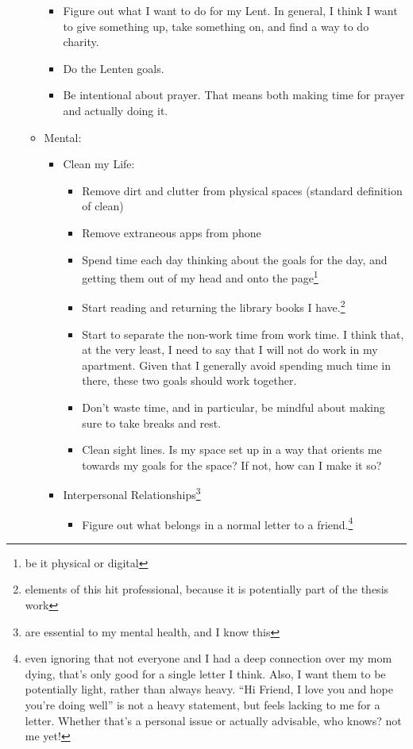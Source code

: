 \documentclass[12pt]{article}[titlepage]
\newcommand{\say}[1]{``#1''}
\renewcommand{\,}{\textsuperscript{,}}
\begin{document}
\begin{itemize}
\begin{itemize}
\begin{itemize}
\item Figure out what I want to do for my Lent. In general, I think I want to give something up, take something on, and find a way to do charity.  
\item Do the Lenten goals.  
\item Be intentional about prayer. That means both making time for prayer and actually doing it.  
\end{itemize}  
\item Mental:  
\begin{itemize}  
\item Clean my Life:  
\begin{itemize}  
\item Remove dirt and clutter from physical spaces (standard definition of clean)  
\item Remove extraneous apps from phone  
\item Spend time each day thinking about the goals for the day, and getting them out of my head and onto the page\footnote{be it physical or digital}  
\item Start reading and returning the library books I have.\footnote{elements of this hit professional, because it is potentially part of the thesis work}  
\item Start to separate the non-work time from work time. I think that, at the very least, I need to say that I will not do work in my apartment. Given that I generally avoid spending much time in there, these two goals should work together.  
\item Don't waste time, and in particular, be mindful about making sure to take breaks and rest.  
\item Clean sight lines. Is my space set up in a way that orients me towards my goals for the space? If not, how can I make it so?  
\end{itemize}  
\item Interpersonal Relationships\footnote{are essential to my mental health, and I know this}  
\begin{itemize}  
\item Figure out what belongs in a normal letter to a friend.\footnote{even ignoring that not everyone and I had a deep connection over my mom dying, that's only good for a single letter I think. Also, I want them to be potentially light, rather than always heavy. \say{Hi Friend, I love you and hope you're doing well} is not a heavy statement, but feels lacking to me for a letter. Whether that's a personal issue or actually advisable, who knows? not me yet!}  

\end{itemize}
\end{itemize}
\end{itemize}
\end{itemize}
\end{document}
